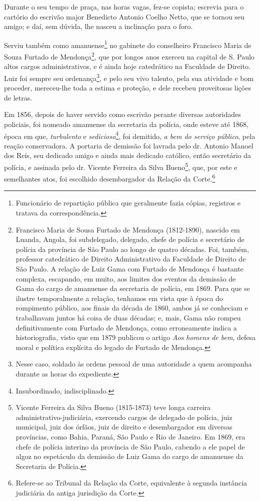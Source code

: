 Durante o seu tempo de praça, nas horas vagas, fez-se copista; escrevia
para o cartório do escrivão major Benedicto Antonio Coelho Netto, que se
tornou seu amigo; e daí, sem dúvida, lhe nasceu a inclinação para o
foro.

Serviu também como amanuense\footnote{Funcionário de repartição
  pública que geralmente fazia cópias, registros e tratava da
  correspondência.} no gabinete do conselheiro Francisco Maria de Souza
Furtado de Mendonça\footnote{Francisco Maria de Sousa Furtado de
  Mendonça (1812-1890), nascido em Luanda, Angola, foi subdelegado,
  delegado, chefe de polícia e secretário de polícia da província de São
  Paulo ao longo de quatro décadas. Foi, também, professor catedrático
  de Direito Administrativo da Faculdade de Direito de São Paulo. A
  relação de Luiz Gama com Furtado de Mendonça é bastante complexa,
  escapando, em muito, aos limites dos eventos da demissão de Gama do
  cargo de amanuense da secretaria de polícia, em 1869. Para que se
  ilustre temporalmente a relação, tenhamos em vista que à época do
  rompimento público, aos finais da década de 1860, ambos já se
  conheciam e trabalhavam juntos há coisa de duas décadas; e, mais, Gama
  não rompeu definitivamente com Furtado de Mendonça, como erroneamente
  indica a historiografia, visto que em 1879 publicou o artigo \emph{Aos
  homens de bem}, defesa moral e política explícita do legado de Furtado
  de Mendonça.}, que por longos anos exerceu na capital de S. Paulo
altos cargos administrativos, e é ainda hoje catedrático na Faculdade de
Direito. Luiz foi sempre seu ordenança\footnote{Nesse caso, soldado às
  ordens pessoal de uma autoridade a quem acompanha durante as horas do
  expediente.}, e pelo seu vivo talento, pela sua atividade e bom
proceder, mereceu-lhe toda a estima e proteção, e dele recebeu
proveitosas lições de letras.

Em 1856, depois de haver servido como escrivão perante diversas
autoridades policiais, foi nomeado amanuense da secretaria da polícia,
onde esteve até 1868, época em que, \emph{turbulento} e
\emph{sedicioso}\footnote{Insubordinado, indisciplinado.}, foi
demitido, \emph{a bem do serviço público}, pela reação conservadora. A
portaria de demissão foi lavrada pelo dr. Antonio Manoel dos Reis, seu
dedicado amigo e ainda mais dedicado católico, então secretário da
polícia, e assinada pelo dr. Vicente Ferreira da Silva Bueno\footnote{
  Vicente Ferreira da Silva Bueno (1815-1873) teve longa carreira
  administrativo-judiciária, exercendo cargos de delegado de polícia,
  juiz municipal, juiz dos órfãos, juiz de direito e desembargador em
  diversas províncias, como Bahia, Paraná, São Paulo e Rio de Janeiro.
  Em 1869, era chefe de polícia interino da província de São Paulo,
  cabendo a ele papel de algoz no espetáculo da demissão de Luiz Gama do
  cargo de amanuense da Secretaria de Polícia.}, que, por este e
semelhantes atos, foi escolhido desembargador da Relação da
Corte.\footnote{Refere-se ao Tribunal da Relação da Corte, equivalente
  à segunda instância judiciária da antiga jurisdição da Corte.}

